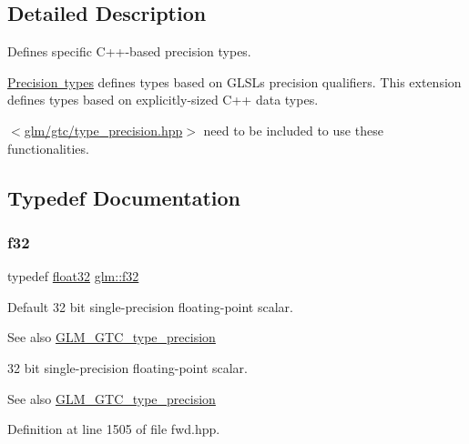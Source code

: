 \subsection{Detailed Description}
Defines specific C++-\/based precision types. 

\mbox{\hyperlink{group__core__precision}{Precision types}} defines types based on G\+L\+SL\textquotesingle{}s precision qualifiers. This extension defines types based on explicitly-\/sized C++ data types.

$<$\mbox{\hyperlink{type__precision_8hpp}{glm/gtc/type\+\_\+precision.\+hpp}}$>$ need to be included to use these functionalities. 

\subsection{Typedef Documentation}
\mbox{\label{group__gtc__type__precision_ga0ec999b57f5330d9021256e96038df04}} 
\subsubsection{\texorpdfstring{f32}{f32}}
{\footnotesize\ttfamily typedef \mbox{\hyperlink{group__gtc__type__precision_ga814f2f65354b6588b067cc5c67a6b340}{float32}} \mbox{\hyperlink{group__gtc__type__precision_ga0ec999b57f5330d9021256e96038df04}{glm\+::f32}}}

Default 32 bit single-\/precision floating-\/point scalar. \begin{DoxySeeAlso}{See also}
\mbox{\hyperlink{group__gtc__type__precision}{G\+L\+M\+\_\+\+G\+T\+C\+\_\+type\+\_\+precision}}
\end{DoxySeeAlso}
32 bit single-\/precision floating-\/point scalar. \begin{DoxySeeAlso}{See also}
\mbox{\hyperlink{group__gtc__type__precision}{G\+L\+M\+\_\+\+G\+T\+C\+\_\+type\+\_\+precision}} 
\end{DoxySeeAlso}


Definition at line 1505 of file fwd.\+hpp.

\mbox{\label{group__gtc__type__precision_ga29b40a1141234160a627a540eceedd31}} 
